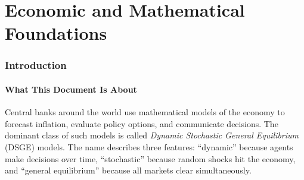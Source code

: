 \documentclass[11pt,a4paper]{article}
\theoremstyle{definition}
\begin{document}
\begin{abstract}
		The software includes an Epstein--Zin NK model extension that separates risk aversion from intertemporal substitution, demonstrating that the UKF is necessary when the excess risk aversion parameter $\delta = \gamma - 1/\psi$ is large.
		
		All prior distributions, parameter transforms, hyperparameter settings, and experimental protocols are documented in full, enabling exact replication by third parties.
		Four appendices provide line-by-line documentation of the accompanying software, connect implementation details to equations, and include an \emph{engineering addendum} (pitfalls and bug post-mortems) written for readers with minimal systems background.
		
		Every equation in this document has been verified against the accompanying Python implementation, and code references are provided throughout.
		No prior knowledge of DSGE models, Kalman filtering, Hamiltonian Monte Carlo, or neural network training is assumed.
		Every algorithm is derived from first principles.
	\end{abstract}
	
	\tableofcontents
	\newpage
	
	
	\part{Economic and Mathematical Foundations}
	
	\section{Introduction}
	\label{sec:intro}
	
	\subsection{What This Document Is About}
	
	Central banks around the world use mathematical models of the economy to forecast inflation, evaluate policy options, and communicate decisions.
	The dominant class of such models is called \emph{Dynamic Stochastic General Equilibrium} (DSGE) models.
	The name describes three features: ``dynamic'' because agents make decisions over time, ``stochastic'' because random shocks hit the economy, and ``general equilibrium'' because all markets clear simultaneously.
	
\end{document}
